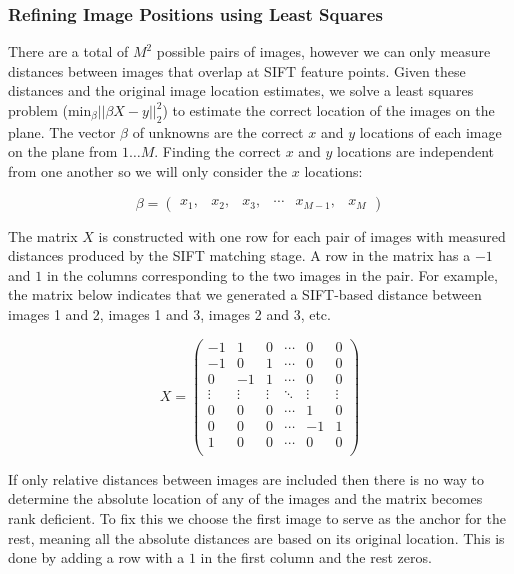 \documentclass[10pt,twocolumn,letterpaper]{article}
\begin{document}
\subsubsection{Refining Image Positions using Least Squares}

There are a total of $M^{2}$ possible pairs of images, however we can
only measure distances between images that overlap at SIFT feature
points. Given these distances and the original image location
estimates, we solve a least squares problem ($\textrm{min}_{\beta}
||\beta X - y||_2^2 $) to estimate the correct location of the images
on the plane. The vector $\beta$ of unknowns are the correct $x$ and
$y$ locations of each image on the plane from $1 \dots M$. Finding the
correct $x$ and $y$ locations are independent from one another so we
will only consider the $x$ locations:


\[\beta =
\begin{pmatrix}
  x_1, & x_2, & x_3, & \cdots & x_{M-1}, & x_M
\end{pmatrix}
\]

The matrix $X$ is constructed with one row for each pair of images
with measured distances produced by the SIFT matching stage. A row in
the matrix has a $-1$ and $1$ in the columns corresponding to the two
images in the pair. For example, the matrix below indicates that we
generated a SIFT-based distance between images 1 and 2, images 1 and
3, images 2 and 3, etc.

\[
X =
\begin{pmatrix}
  -1 & 1 & 0 & \cdots & 0 & 0\\
  -1 & 0 & 1 & \cdots & 0 & 0\\
  0 & -1 & 1 & \cdots & 0 & 0\\
  \vdots  & \vdots & \vdots & \ddots & \vdots  & \vdots\\
  0 & 0 & 0 & \cdots & 1 & 0 \\
  0 & 0 & 0 & \cdots & -1 & 1 \\
  1 & 0 & 0 & \cdots & 0 & 0 \\
\end{pmatrix}
\]

If only relative distances between images are included then there is
no way to determine the absolute location of any of the images and the
matrix becomes rank deficient. To fix this we choose the first image
to serve as the anchor for the rest, meaning all the absolute
distances are based on its original location. This is done by adding a
row with a $1$ in the first column and the rest zeros.
\end{document}
